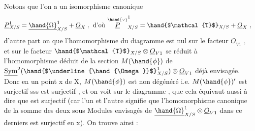 Notons que l'on a un isomorphisme canonique
\[ \underline{P}^1_{X/S} = \underline{\hand{\Omega}}^1_{X/S} + \underline{O}_X \ ,\ \text{d'où}\ \overset{\hand{\scriptscriptstyle\vee}}{\underline{P}}^1_{X/S} = \hand{$\mathcal{T}$}_{X/S} + \underline{O}_X \ , \]
d'autre part on  que l'homomorphisme  \hand{$\mu$} du diagramme  est nul
sur le facteur $\underline{O}_{V1}$ , et sur le facteur $\hand{$\mathcal{T}$}_{X/S}\otimes\underline{O}_{V1}$  se réduit à
l'homomorphisme  déduit de la section $M(\hand{\phi})$ de $\underline{\mathrm{Sym}}^2(\hand{$\underline{\hand{\Omega}}$}^1_{X/S})\otimes \underline{O}_{V1}$ déjà
envisagée. Donc en un point x de X, $M(\hand{\phi})$ est non dégénéré i.e. $M(\hand{\phi})'$
est surjectif sss \hand{$\mu$} est surjectif , et on voit sur le diagramme ,
que cela équivaut aussi à dire que \hand{$\nu$} est surjectif  (car l'un et l'autre
signifie que l'homomorphisme canonique de la somme des deux sous
Modules envisagés de $\underline{\hand{\Omega}}^1_{X/S}\otimes \underline{O}_{V1}$ dans ce derniers est surjectif en
x). On trouve ainsi :

